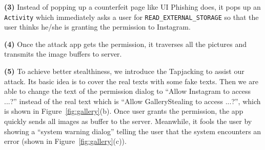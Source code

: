 \documentclass[letterpaper,12pt]{article}
\begin{document}
\textbf{(3)} Instead of popping up a counterfeit
page like UI Phishing does, it pops up an \texttt{Activity} which
immediately asks a user for \texttt{READ\_EXTERNAL\_STORAGE} so that
the user thinks he/she is granting the permission to Instagram.

\textbf{(4)} Once the attack app gets the permission, it traverses all the pictures and transmits the image buffers to server.

\textbf{(5)} To achieve better stealthiness, we introduce the
Tapjacking to assist our attack. Its basic idea is to cover the real
texts with some fake texts. Then we are able to change the text of the
permission dialog to ``Allow Instagram to access ...?'' instead of the
real text which is ``Allow GalleryStealing to access ...?'', which is
shown in Figure~\ref{fig:gallery}(b). Once user grants the
permission, the app quickly sends all images as buffer to the server.
Meanwhile, it fools the user by showing a ``system warning dialog''
telling the user that the system encounters an error (shown in
Figure~\ref{fig:gallery}(c)).
\end{document}
